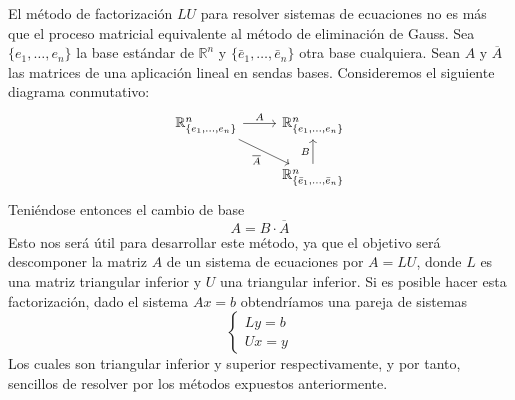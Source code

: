  El método de factorización $LU$ para resolver sistemas de ecuaciones no es más que el proceso matricial equivalente al método de eliminación de Gauss. Sea $\{e_1,\ldots,e_n\}$ la base estándar de $\mathbb{R}^n$ y $\{\bar{e}_1,\ldots,\bar{e}_n\}$ otra base cualquiera. Sean $A$ y $\overline{A}$ las matrices de una aplicación lineal en sendas bases. Consideremos el siguiente diagrama conmutativo:
$$\begin{tikzcd}
\mathbb R^{n}_{\{e_1,\ldots,e_n\} } \arrow{r}{A}  \arrow[swap]{dr}{\overline{A}} & \mathbb R^{n}_{\{e_1,\ldots,e_n\}}\\
& \mathbb R^{n}_{\{\bar{e}_1,\ldots,\bar{e}_n\}} \arrow{u}{B}
\end{tikzcd}$$
Teniéndose entonces  el cambio de base
$$\boxed{A=B \cdot \overline{A}}$$
Esto nos será útil para desarrollar este método, ya que el objetivo será descomponer la matriz $A$ de un sistema de ecuaciones por $A=LU$, donde $L$ es una matriz triangular inferior y $U$ una triangular inferior. Si es posible hacer esta factorización, dado el sistema $Ax=b$ obtendríamos una pareja de sistemas
$$\begin{cases}Ly=b \\ Ux=y\end{cases}$$
Los cuales son triangular inferior y superior respectivamente, y por tanto, sencillos de resolver por los métodos expuestos anteriormente.
